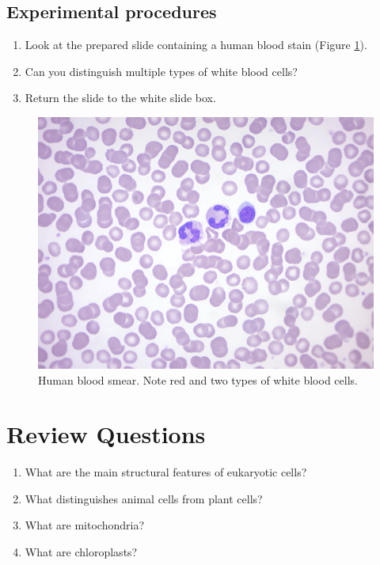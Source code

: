 \subsection{Experimental procedures}\label{experimental-procedures-12}

\begin{enumerate}
\def\labelenumi{\arabic{enumi}.}
\tightlist
\item
  Look at the prepared slide containing a human blood stain (Figure \ref{fig:blood}).
\item
  Can you distinguish multiple types of white blood cells?
\item
  Return the slide to the white slide box.
\end{enumerate}

\begin{figure}

{\centering \includegraphics[width=0.7\linewidth]{./figures/cell_struc/blood} 

}

\caption{Human blood smear. Note red and two types of white blood cells.}\label{fig:blood}
\end{figure}

\section{Review Questions}\label{review-questions-2}

\begin{enumerate}
\def\labelenumi{\arabic{enumi}.}
\tightlist
\item
  What are the main structural features of eukaryotic cells?
\item
  What distinguishes animal cells from plant cells?
\item
  What are mitochondria?
\item
  What are chloroplasts?
\end{enumerate}
